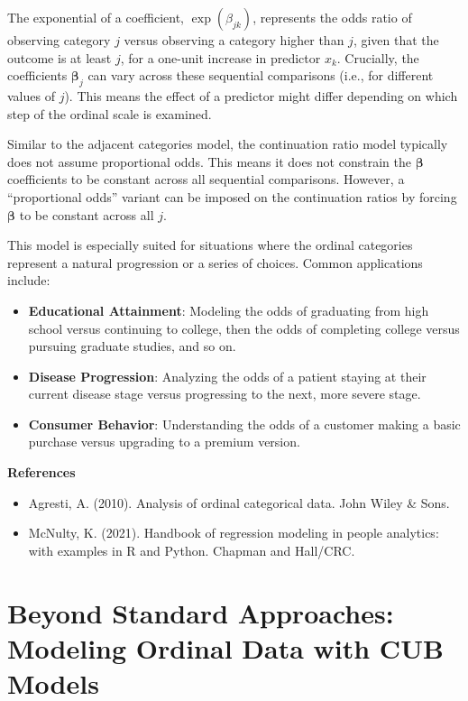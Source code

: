 \documentclass[
  letterpaper,
  DIV=11,
  numbers=noendperiod]{scrartcl}
\begin{document}
The exponential of a coefficient, \(\exp(\beta_{jk})\), represents the
odds ratio of observing category \(j\) versus observing a category
higher than \(j\), given that the outcome is at least \(j\), for a
one-unit increase in predictor \(x_k\). Crucially, the coefficients
\(\boldsymbol{\beta}_j\) can vary across these sequential comparisons
(i.e., for different values of \(j\)). This means the effect of a
predictor might differ depending on which step of the ordinal scale is
examined.

Similar to the adjacent categories model, the continuation ratio model
typically does not assume proportional odds. This means it does not
constrain the \(\boldsymbol{\beta}\) coefficients to be constant across
all sequential comparisons. However, a ``proportional odds'' variant can
be imposed on the continuation ratios by forcing \(\boldsymbol{\beta}\)
to be constant across all \(j\).

This model is especially suited for situations where the ordinal
categories represent a natural progression or a series of choices.
Common applications include:

\begin{itemize}
\item
  \textbf{Educational Attainment}: Modeling the odds of graduating from
  high school versus continuing to college, then the odds of completing
  college versus pursuing graduate studies, and so on.
\item
  \textbf{Disease Progression}: Analyzing the odds of a patient staying
  at their current disease stage versus progressing to the next, more
  severe stage.
\item
  \textbf{Consumer Behavior}: Understanding the odds of a customer
  making a basic purchase versus upgrading to a premium version.
\end{itemize}

\textbf{References}

\begin{itemize}
\item
  Agresti, A. (2010). Analysis of ordinal categorical data. John Wiley
  \& Sons.
\item
  McNulty, K. (2021). Handbook of regression modeling in people
  analytics: with examples in R and Python. Chapman and Hall/CRC.
\end{itemize}

\hypertarget{beyond-standard-approaches-modeling-ordinal-data-with-cub-models}{%
\section{Beyond Standard Approaches: Modeling Ordinal Data with CUB
Models}\label{beyond-standard-approaches-modeling-ordinal-data-with-cub-models}}
\end{document}

